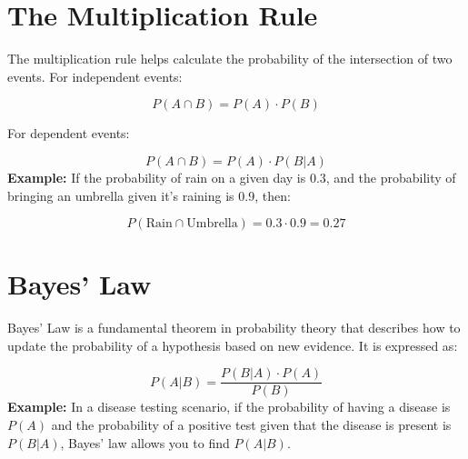 \documentclass{article}
\begin{document}
\newpage

\section{The Multiplication Rule}
The multiplication rule helps calculate the probability of the intersection of two events. For independent events:

\[
P(A \cap B) = P(A) \cdot P(B)
\]

For dependent events:

\[
P(A \cap B) = P(A) \cdot P(B|A)
\]
\vspace{1em}
\textbf{Example:} If the probability of rain on a given day is 0.3, and the probability of bringing an umbrella given it's raining is 0.9, then:

\[
P(\text{Rain} \cap \text{Umbrella}) = 0.3 \cdot 0.9 = 0.27
\]

\newpage

\section{Bayes’ Law}
Bayes' Law is a fundamental theorem in probability theory that describes how to update the probability of a hypothesis based on new evidence. It is expressed as:

\[
P(A|B) = \frac{P(B|A) \cdot P(A)}{P(B)}
\]
\vspace{1em}
\textbf{Example:} In a disease testing scenario, if the probability of having a disease is \(P(A)\) and the probability of a positive test given that the disease is present is \(P(B|A)\), Bayes' law allows you to find \(P(A|B)\).
\end{document}
